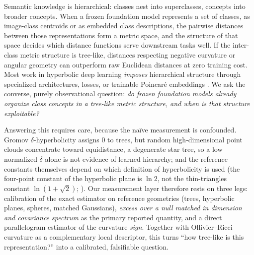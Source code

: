 \documentclass{article} %
\begin{document}
Semantic knowledge is hierarchical: classes nest into superclasses, concepts into broader concepts. When a frozen foundation model represents a set of classes, as image-class centroids or as embedded class descriptions, the pairwise distances between those representations form a metric space, and the structure of that space decides which distance functions serve downstream tasks well. If the inter-class metric structure is tree-like, distances respecting negative curvature or angular geometry can outperform raw Euclidean distances at zero training cost. Most work in hyperbolic deep learning \emph{imposes} hierarchical structure through specialized architectures, losses, or trainable Poincar\'{e} embeddings \citep{nickel2017poincare, Khrulkov_2020_CVPR, chen2022fully, desai2023meru}. We ask the converse, purely observational question: \emph{do frozen foundation models already organize class concepts in a tree-like metric structure, and when is that structure exploitable?}

Answering this requires care, because the na\"ive measurement is confounded. Gromov $\delta$-hyperbolicity \citep{Gromov1987} assigns $0$ to trees, but random high-dimensional point clouds concentrate toward equidistance, a degenerate star tree, so a low normalized $\delta$ alone is not evidence of learned hierarchy; and the reference constants themselves depend on which definition of hyperbolicity is used (the four-point constant of the hyperbolic plane is $\ln 2$, not the thin-triangles constant $\ln(1+\sqrt{2})$; \citealp{nica2016strong}).
Our measurement layer therefore rests on three legs: calibration of the exact estimator on reference geometries (trees, hyperbolic planes, spheres, matched Gaussians), \emph{excess over a null matched in dimension and covariance spectrum} as the primary reported quantity, and a direct parallelogram estimator of the curvature \emph{sign}. Together with Ollivier--Ricci curvature \citep{ollivier2009ricci} as a complementary local descriptor, this turns ``how tree-like is this representation?'' into a calibrated, falsifiable question.
\end{document}
